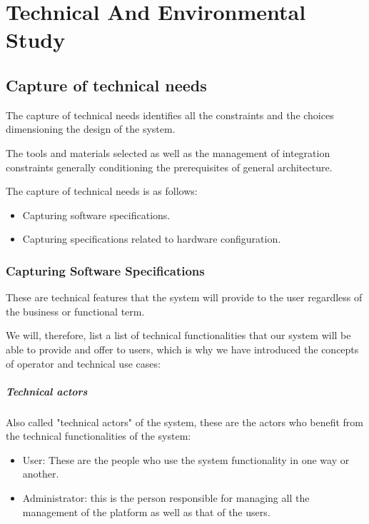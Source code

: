 

\setcounter{mtc}{10}

\chapter{Technical And Environmental Study}%
\label{chap:chapter_tree}
\minitoc
\section{Capture of technical needs}
The capture of technical needs identifies all the constraints and the choices dimensioning the design of the system.

The tools and materials selected as well as the management of integration constraints generally conditioning the prerequisites of general architecture.

The capture of technical needs is as follows:
\begin{itemize}\addtolength{\itemsep}{-0.35\baselineskip}
      \item
            Capturing software specifications.

      \item
            Capturing specifications related to hardware configuration.

\end{itemize}

\subsection{Capturing Software Specifications}
These are technical features that the system will provide to the user regardless of the business or functional term.

We will, therefore, list a list of technical functionalities that our system will be able to provide and offer to users, which is why we have introduced the concepts of operator and technical use cases:

\paragraph{Technical actors}
Also called "technical actors" of the system, these are the actors who benefit from the technical functionalities of the system:
\begin{itemize}\addtolength{\itemsep}{-0.35\baselineskip}
      \item
            User: These are the people who use the system functionality in one way or another.
      \item
            Administrator: this is the person responsible for managing all the management of the platform as well as that of the users.
\end{itemize}

